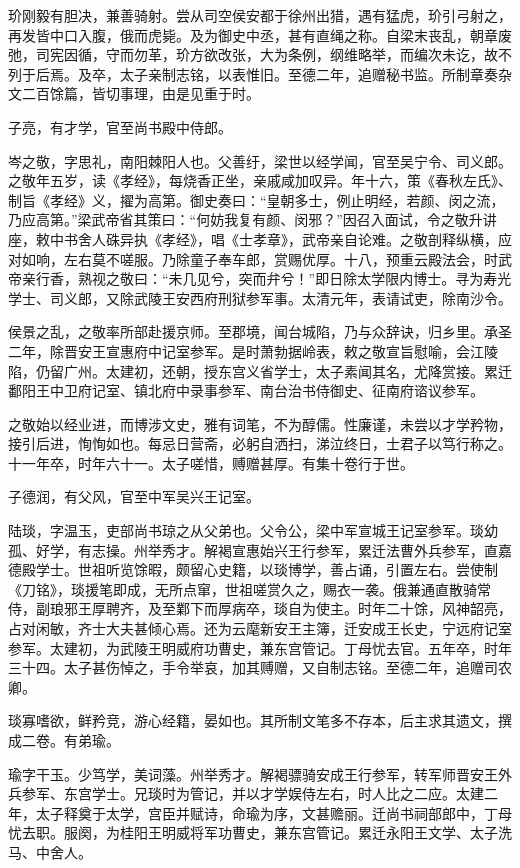 \documentclass[]{article}
\begin{document}
玠刚毅有胆决，兼善骑射。尝从司空侯安都于徐州出猎，遇有猛虎，玠引弓射之，再发皆中口入腹，俄而虎毙。及为御史中丞，甚有直绳之称。自梁末丧乱，朝章废弛，司宪因循，守而勿革，玠方欲改张，大为条例，纲维略举，而编次未讫，故不列于后焉。及卒，太子亲制志铭，以表惟旧。至德二年，追赠秘书监。所制章奏杂文二百馀篇，皆切事理，由是见重于时。

子亮，有才学，官至尚书殿中侍郎。

岑之敬，字思礼，南阳棘阳人也。父善纡，梁世以经学闻，官至吴宁令、司义郎。之敬年五岁，读《孝经》，每烧香正坐，亲戚咸加叹异。年十六，策《春秋左氏》、制旨《孝经》义，擢为高第。御史奏曰：``皇朝多士，例止明经，若颜、闵之流，乃应高第。''梁武帝省其策曰：``何妨我复有颜、闵邪？''因召入面试，令之敬升讲座，敕中书舍人硃异执《孝经》，唱《士孝章》，武帝亲自论难。之敬剖释纵横，应对如响，左右莫不嗟服。乃除童子奉车郎，赏赐优厚。十八，预重云殿法会，时武帝亲行香，熟视之敬曰：``未几见兮，突而弁兮！''即日除太学限内博士。寻为寿光学士、司义郎，又除武陵王安西府刑狱参军事。太清元年，表请试吏，除南沙令。

侯景之乱，之敬率所部赴援京师。至郡境，闻台城陷，乃与众辞诀，归乡里。承圣二年，除晋安王宣惠府中记室参军。是时萧勃据岭表，敕之敬宣旨慰喻，会江陵陷，仍留广州。太建初，还朝，授东宫义省学士，太子素闻其名，尤降赏接。累迁鄱阳王中卫府记室、镇北府中录事参军、南台治书侍御史、征南府谘议参军。

之敬始以经业进，而博涉文史，雅有词笔，不为醇儒。性廉谨，未尝以才学矜物，接引后进，恂恂如也。每忌日营斋，必躬自洒扫，涕泣终日，士君子以笃行称之。十一年卒，时年六十一。太子嗟惜，赙赠甚厚。有集十卷行于世。

子德润，有父风，官至中军吴兴王记室。

陆琰，字温玉，吏部尚书琼之从父弟也。父令公，梁中军宣城王记室参军。琰幼孤、好学，有志操。州举秀才。解褐宣惠始兴王行参军，累迁法曹外兵参军，直嘉德殿学士。世祖听览馀暇，颇留心史籍，以琰博学，善占诵，引置左右。尝使制《刀铭》，琰援笔即成，无所点窜，世祖嗟赏久之，赐衣一袭。俄兼通直散骑常侍，副琅邪王厚聘齐，及至鄴下而厚病卒，琰自为使主。时年二十馀，风神韶亮，占对闲敏，齐士大夫甚倾心焉。还为云麾新安王主簿，迁安成王长史，宁远府记室参军。太建初，为武陵王明威府功曹史，兼东宫管记。丁母忧去官。五年卒，时年三十四。太子甚伤悼之，手令举哀，加其赙赠，又自制志铭。至德二年，追赠司农卿。

琰寡嗜欲，鲜矜竞，游心经籍，晏如也。其所制文笔多不存本，后主求其遗文，撰成二卷。有弟瑜。

瑜字干玉。少笃学，美词藻。州举秀才。解褐骠骑安成王行参军，转军师晋安王外兵参军、东宫学士。兄琰时为管记，并以才学娱侍左右，时人比之二应。太建二年，太子释奠于太学，宫臣并赋诗，命瑜为序，文甚赡丽。迁尚书祠部郎中，丁母忧去职。服阕，为桂阳王明威将军功曹史，兼东宫管记。累迁永阳王文学、太子洗马、中舍人。
\end{document}
